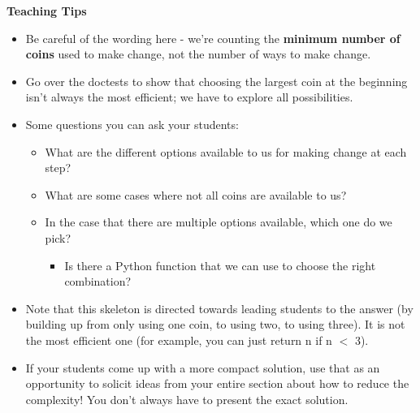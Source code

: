 \begin{blocksection}
 \begin{guide}
   \textbf{Teaching Tips}
   \begin{itemize}
       \item Be careful of the wording here - we’re counting the \textbf{minimum number of coins} used to make change, not the number of ways to make change.
       \item Go over the doctests to show that choosing the largest coin at the beginning isn't always the most efficient; we have to explore all possibilities. 
       \item Some questions you can ask your students: 
       \begin{itemize}
        \item What are the different options available to us for making change at each step? 
        \item What are some cases where not all coins are available to us? 
        \item In the case that there are multiple options available, which one do we pick? 
        \begin{itemize}
          \item Is there a Python function that we can use to choose the right combination?
        \end{itemize}
       \end{itemize}
       \item Note that this skeleton is directed towards leading students to the answer (by building up from only using one coin, to using two, to using three). It is not the most efficient one (for example, you can just return n if n $<$ 3). 
       \item If your students come up with a more compact solution, use that as an opportunity to solicit ideas from your entire section about how to reduce the complexity! You don't always have to present the exact solution.
   \end{itemize}
 \end{guide}
 \end{blocksection}
